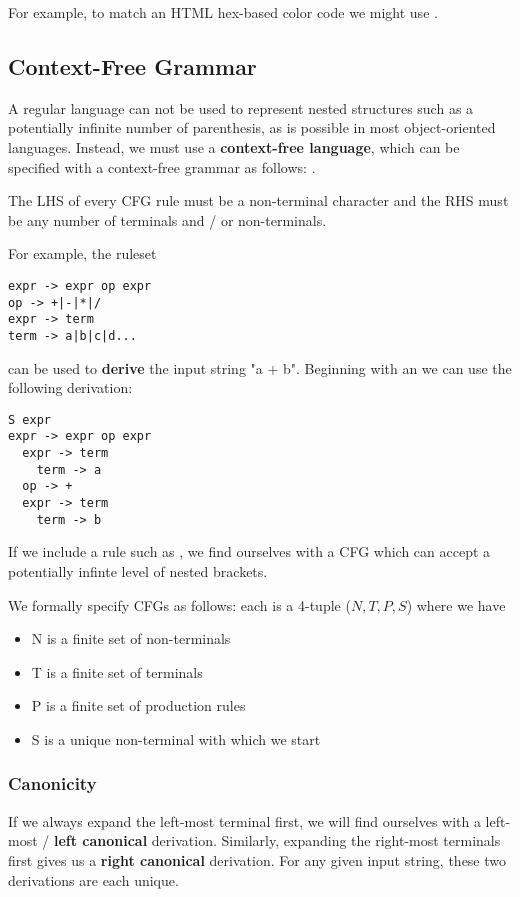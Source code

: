 \documentclass[12pt]{article}
\begin{document}
For example, to match an HTML hex-based color code we might use .

\subsection*{Context-Free Grammar}
A regular language can not be used to represent nested structures such as a potentially infinite number of parenthesis, as is possible in most object-oriented languages. Instead, we must use a {\bf context-free language}, which can be specified with a context-free grammar as follows: .

The LHS of every CFG rule must be a non-terminal character and the RHS must be any number of terminals and / or non-terminals.

For example, the ruleset
\begin{verbatim}
expr -> expr op expr
op -> +|-|*|/
expr -> term
term -> a|b|c|d...
\end{verbatim}
can be used to {\bf derive} the input string "a + b". Beginning with an  we can use the following derivation:
\begin{verbatim}
S expr
expr -> expr op expr
  expr -> term
    term -> a
  op -> +
  expr -> term
    term -> b
\end{verbatim}

If we include a rule such as , we find ourselves with a CFG which can accept a potentially infinte level of nested brackets.

We formally specify CFGs as follows: each is a 4-tuple ($N, T, P, S$) where we have
\begin{itemize}
\item N is a finite set of non-terminals
\item T is a finite set of terminals
\item P is a finite set of production rules
\item S is a unique non-terminal with which we start
\end{itemize}

\subsubsection*{Canonicity}
If we always expand the left-most terminal first, we will find ourselves with a left-most / {\bf left canonical} derivation. Similarly, expanding the right-most terminals first gives us a {\bf right canonical} derivation. For any given input string, these two derivations are each unique.
\end{document}
